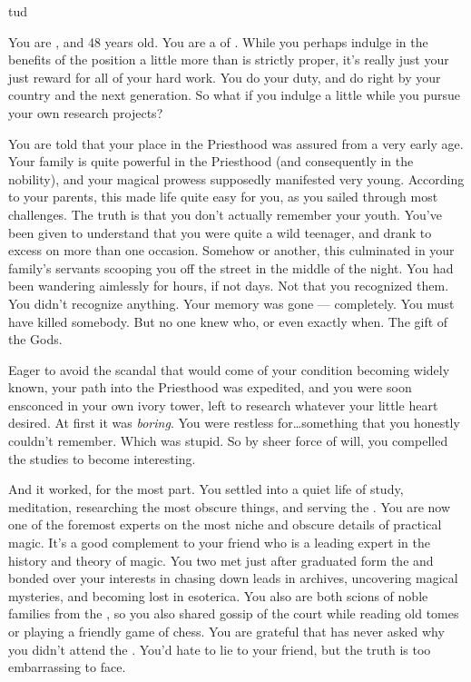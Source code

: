 tud\documentclass[char]{GL2020}
\begin{document}
\name{\cHedonist{}}

You are \cHedonist{\intro}, and 48 years old. You are a \cHedonist{\cleric} of \cFarmGod{}. While you perhaps indulge in the benefits of the position a little more than is strictly proper, it’s really just your just reward for all of your hard work. You do your duty, and do right by your country and the next generation. So what if you indulge a little while you pursue your own research projects?

You are told that your place in the Priesthood was assured from a very early age. Your family is quite powerful in the Priesthood (and consequently in the nobility), and your magical prowess supposedly manifested very young. According to your parents, this made life quite easy for you, as you sailed through most challenges. The truth is that you don’t actually remember your youth. You’ve been given to understand that you were quite a wild teenager, and drank to excess on more than one occasion. Somehow or another, this culminated in your family’s servants scooping you off the street in the middle of the night. You had been wandering aimlessly for hours, if not days. Not that you recognized them. You didn’t recognize anything. Your memory was gone — completely. You must have killed somebody. But no one knew who, or even exactly when. The gift of the Gods.

Eager to avoid the scandal that would come of your condition becoming widely known, your path into the Priesthood was expedited, and you were soon ensconced in your own ivory tower, left to research whatever your little heart desired. At first it was \emph{boring}. You were restless for\ldots something that you honestly couldn’t remember. Which was stupid. So by sheer force of will, you compelled the studies to become interesting.

And it worked, for the most part. You settled into a quiet life of study, meditation, researching the most obscure things, and serving the \pFarmers{}. You are now one of the foremost experts on  the most niche and obscure details of practical magic. It’s a good complement to your friend \cWildCard{} who is a leading expert in the history and theory of magic. You two met just after \cWildCard{\they} graduated form the \pSchool{} and bonded over your interests in chasing down leads in archives, uncovering magical mysteries, and becoming lost in esoterica. You also are both scions of noble families from the \pFarm{}, so you also shared gossip of the court while reading old tomes or playing a friendly game of chess. You are grateful that \cWildCard{} has never asked why you didn’t attend the \pSc{}. You’d hate to lie to your friend, but the truth is too embarrassing to face.
\end{document}
